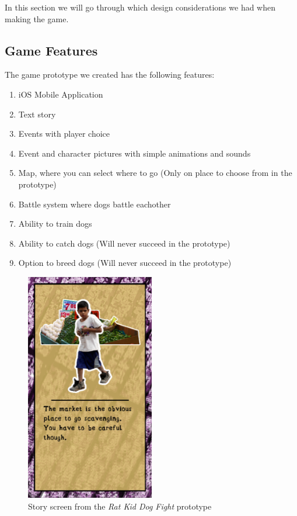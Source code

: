 In this section we will go through which design considerations we had when making the game.\\

\subsection{Game Features}
The game prototype we created has the following features:

\begin{enumerate}
	\item iOS Mobile Application
	\item Text story
	\item Events with player choice
	\item Event and character pictures with simple animations and sounds
	\item Map, where you can select where to go (Only on place to choose from in the prototype)
	\item Battle system where dogs battle eachother
	\item Ability to train dogs
	\item Ability to catch dogs (Will never succeed in the prototype)
	\item Option to breed dogs (Will never succeed in the prototype)
\end{enumerate}

\begin{figure}[h!] 
	\centering
    \includegraphics[width=0.5\textwidth]{GameScreen1.png}
    \caption{Story screen from the \textit{Rat Kid Dog Fight} prototype}
    \label{fig:GameScreen}
\end{figure}

